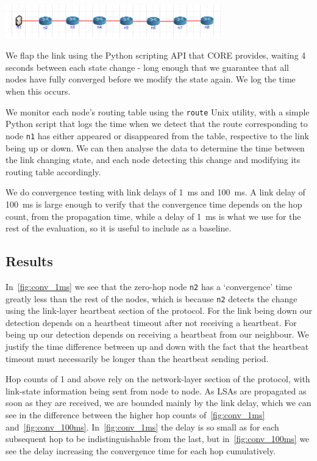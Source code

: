 \documentclass[withindex,glossary,openany]{cam-thesis}
\begin{document}
\begin{minipage}{1\textwidth} \centering
	\includegraphics[width=0.7\textwidth]{conv_topology}
	\label{fig:conv_topology}
\end{minipage}

We flap the link using the Python scripting API that CORE provides, waiting 4 seconds between each state change - long enough that we guarantee that all nodes have fully converged before we modify the state again. We log the time when this occurs.

We monitor each node's routing table using the \texttt{route} Unix utility, with a simple Python script that logs the time when we detect that the route corresponding to node \texttt{n1} has either appeared or disappeared from the table, respective to the link being up or down. We can then analyse the data to determine the time between the link changing state, and each node detecting this change and modifying its routing table accordingly.

We do convergence testing with link delays of \SI{1}{\ms} and \SI{100}{\ms}. A link delay of \SI{100}{\ms} is large enough to verify that the convergence time depends on the hop count, from the propagation time, while a delay of \SI{1}{\ms} is what we use for the rest of the evaluation, so it is useful to include as a baseline.

\subsection{Results}

In~\ref{fig:conv_1ms} we see that the zero-hop node \texttt{n2} has a `convergence' time greatly less than the rest of the nodes, which is because \texttt{n2} detects the change using the link-layer heartbeat section of the protocol. For the link being down our detection depends on a heartbeat timeout after not receiving a heartbeat. For being up our detection depends on receiving a heartbeat from our neighbour. We justify the time difference between up and down with the fact that the heartbeat timeout must necessarily be longer than the heartbeat sending period.

Hop counts of 1 and above rely on the network-layer section of the protocol, with link-state information being sent from node to node. As LSAs are propagated as soon as they are received, we are bounded mainly by the link delay, which we can see in the difference between the higher hop counts of~\ref{fig:conv_1ms} and~\ref{fig:conv_100ms}. In~\ref{fig:conv_1ms} the delay is so small as for each subsequent hop to be indistinguishable from the last, but in~\ref{fig:conv_100ms} we see the delay increasing the convergence time for each hop cumulatively.
\end{document}

